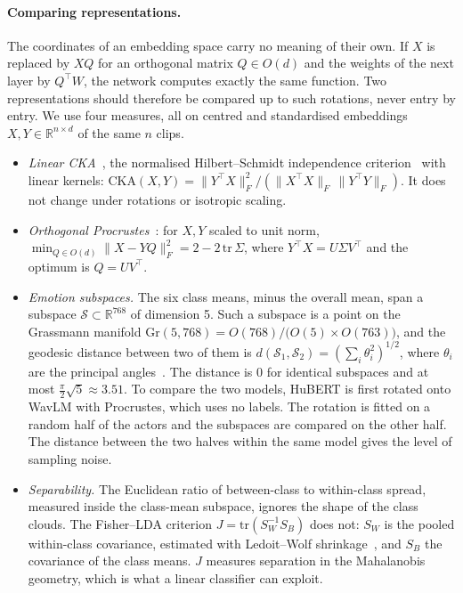 \documentclass[11pt,a4paper]{article}
\begin{document}
\paragraph{Comparing representations.} The coordinates of an embedding space carry no meaning
of their own. If $X$ is replaced by $XQ$ for an orthogonal matrix $Q\in O(d)$ and the weights of
the next layer by $Q^\top W$, the network computes exactly the same function. Two
representations should therefore be compared up to such rotations, never entry by entry. We use
four measures, all on centred and standardised embeddings $X,Y\in\mathbb{R}^{n\times d}$ of the
same $n$ clips.
\begin{itemize}[leftmargin=1.4em]
\item \emph{Linear CKA}~\citep{kornblith2019cka}, the normalised Hilbert--Schmidt independence
      criterion~\citep{gretton2005hsic} with linear kernels:
      $\mathrm{CKA}(X,Y)=\|Y^\top X\|_F^2/(\|X^\top X\|_F\,\|Y^\top Y\|_F)$. It does not change
      under rotations or isotropic scaling.
\item \emph{Orthogonal Procrustes}~\citep{schonemann1966procrustes}: for $X,Y$ scaled to unit
      norm, $\min_{Q\in O(d)}\|X-YQ\|_F^2 = 2-2\,\mathrm{tr}\,\Sigma$, where
      $Y^\top X=U\Sigma V^\top$ and the optimum is $Q=UV^\top$.
\item \emph{Emotion subspaces.} The six class means, minus the overall mean, span a subspace
      $\mathcal{S}\subset\mathbb{R}^{768}$ of dimension 5. Such a subspace is a point on the
      Grassmann manifold $\mathrm{Gr}(5,768)=O(768)/\bigl(O(5)\times O(763)\bigr)$, and the
      geodesic distance between two of them is $d(\mathcal{S}_1,\mathcal{S}_2)=(\sum_i\theta_i^2)^{1/2}$,
      where $\theta_i$ are the principal angles~\citep{edelman1998geometry}. The distance is 0
      for identical subspaces and at most $\tfrac{\pi}{2}\sqrt5\approx3.51$. To compare the two
      models, HuBERT is first rotated onto WavLM with Procrustes, which uses no labels. The
      rotation is fitted on a random half of the actors and the subspaces are compared on the
      other half. The distance between the two halves within the same model gives the level of
      sampling noise.
\item \emph{Separability.} The Euclidean ratio of between-class to within-class spread, measured
      inside the class-mean subspace, ignores the shape of the class clouds. The Fisher--LDA
      criterion $J=\mathrm{tr}(S_W^{-1}S_B)$ does not: $S_W$ is the pooled within-class
      covariance, estimated with Ledoit--Wolf shrinkage~\citep{ledoit2004shrinkage}, and $S_B$
      the covariance of the class means. $J$ measures separation in the Mahalanobis geometry,
      which is what a linear classifier can exploit.
\end{itemize}
\end{document}
